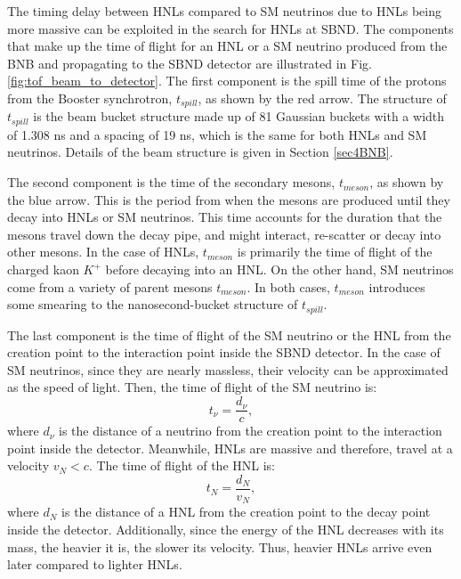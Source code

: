 The timing delay between HNLs compared to SM neutrinos due to HNLs being more massive can be exploited in the search for HNLs at SBND. 
The components that make up the time of flight for an HNL or a SM neutrino produced from the BNB and propagating to the SBND detector are illustrated in Fig. \ref{fig:tof_beam_to_detector}.
The first component is the spill time of the protons from the Booster synchrotron, $t_{spill}$, as shown by the red arrow.
The structure of $t_{spill}$ is the beam bucket structure made up of 81 Gaussian buckets with a width of 1.308 ns and a spacing of 19 ns, which is the same for both HNLs and SM neutrinos.
Details of the beam structure is given in Section \ref{sec4BNB}.   

The second component is the time of the secondary mesons, $t_{meson}$, as shown by the blue arrow.
This is the period from when the mesons are produced until they decay into HNLs or SM neutrinos.
This time accounts for the duration that the mesons travel down the decay pipe, and might interact, re-scatter or decay into other mesons.
In the case of HNLs, $t_{meson}$ is primarily the time of flight of the charged kaon $K^+$ before decaying into an HNL.
On the other hand, SM neutrinos come from a variety of parent mesons $t_{meson}$. %
In both cases, $t_{meson}$ introduces some smearing to the nanosecond-bucket structure of $t_{spill}$.

The last component is the time of flight of the SM neutrino or the HNL from the creation point to the interaction point inside the SBND detector.
In the case of SM neutrinos, since they are nearly massless, their velocity can be approximated as the speed of light. 
Then, the time of flight of the SM neutrino is:  
\begin{equation}
	t_{\nu} = \frac{d_{\nu}}{c},
\end{equation}
where $d_{\nu}$ is the distance of a neutrino from the creation point to the interaction point inside the detector.
Meanwhile, HNLs are massive and therefore, travel at a velocity $v_N < c$.
The time of flight of the HNL is:
\begin{equation}
	t_{N} = \frac{d_{N}}{v_N},
\end{equation}
where $d_N$ is the distance of a HNL from the creation point to the decay point inside the detector.
Additionally, since the energy of the HNL decreases with its mass, the heavier it is, the slower its velocity.
Thus, heavier HNLs arrive even later compared to lighter HNLs.

